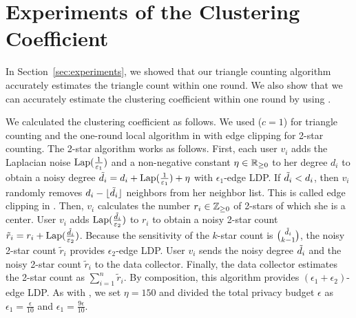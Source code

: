 \appendix
\allowdisplaybreaks[1]


\section{Experiments of the Clustering Coefficient}
\label{sec:cluster}
In Section~\ref{sec:experiments}, we showed that our triangle counting algorithm \AlgWSTriVR{} accurately estimates the triangle count within one round.
We also show that we can accurately estimate the clustering coefficient within one round by using \AlgWSTriVR{}.

We calculated the clustering coefficient as follows.
We used \AlgWSTriVR{} ($c=1$) for triangle counting and
the one-round local algorithm in \cite{Imola_USENIX21} with edge clipping \cite{Imola_USENIX22}
for 2-star counting.
The 2-star algorithm works as follows.
First, each user $v_i$ adds the Laplacian noise $\textrm{Lap}(\frac{1}{\varepsilon_1})$ and a non-negative constant $\eta \in \mathbb{R}_{\ge0}$ to her degree $d_i$ to obtain a noisy degree $\tilde{d}_i = d_i + \textrm{Lap}(\frac{1}{\varepsilon_1}) + \eta$ with $\epsilon_1$-edge LDP.
If $\tilde{d}_i < d_i$, then $v_i$ randomly removes $d_i - \lfloor \tilde{d}_i \rfloor$ neighbors from her neighbor list.
This is called edge clipping in \cite{Imola_USENIX22}.
Then, $v_i$ calculates the number $r_i \in \mathbb{Z}_{\ge0}$ of 2-stars of which she is a center.
User $v_i$ adds $\textrm{Lap}(\frac{\tilde{d}_i}{\varepsilon_2})$ to $r_i$ to obtain a noisy 2-star count $\tilde{r}_i = r_i + \textrm{Lap}(\frac{\tilde{d}_i}{\varepsilon_2})$.
Because the sensitivity of the $k$-star count is $\binom{\tilde{d}_i}{k-1}$, the noisy 2-star count $\tilde{r}_i$ provides $\epsilon_2$-edge LDP.
User $v_i$ sends the noisy degree $\tilde{d}_i$ and the noisy 2-star count $\tilde{r}_i$ to the data collector.
Finally, the data collector estimates the 2-star count as $\sum_{i=1}^n \tilde{r}_i$.
By composition, this algorithm provides $(\epsilon_1 + \epsilon_2)$-edge LDP.
As with \cite{Imola_USENIX22}, we set $\eta = 150$ and divided the total privacy budget $\epsilon$ as $\epsilon_1 = \frac{\epsilon}{10}$ and $\epsilon_1 = \frac{9\epsilon}{10}$.


